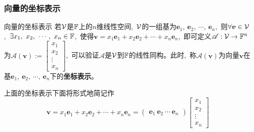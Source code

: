 \documentclass[10pt, a4paper, oneside, fontset=none]{ctexart}
\theoremstyle{plain}
\theoremstyle{definition}
\newcommand{\com}{,\,\,\,\:}
\newcommand{\de}[2][]{\begin{defil}{#1}\kai #2\end{defil}}
\newcommand{\tboba}[1]{\textbf{\kai\color{bali!75!black}#1}}
\begin{document}
\subsubsection{向量的坐标表示}
\de[向量的坐标表示]{
    若$\mathcal{V}$是$\mathbb{F}$上的$n$维线性空间\com $\mathcal{V}$的一组基为$\boldsymbol{e}_1,~\boldsymbol{e}_2,~\cdots,~\boldsymbol{e}_n$\com 则$\forall \boldsymbol{v} \in \mathcal{V}$\com $\exists x_1,~x_2,~\cdots,~x_n \in \mathbb{F}$\com 使得$\boldsymbol{v}=x_1\boldsymbol{e}_1+x_2\boldsymbol{e}_2+\cdots+x_n\boldsymbol{e}_n$\com 即可定义$\mathscr{A}:\mathcal{V} \to \mathbb{F}^n$为$\mathscr{A}(\boldsymbol{v}):=\begin{bmatrix}
        x_1 \\ x_2 \\ \vdots \\ x_n
    \end{bmatrix}$\com 可以验证$\mathscr{A}$是$\mathcal{V}$到$\mathbb{F}$的线性同构。此时\com 称$\mathscr{A}(\boldsymbol{v})$为向量$\boldsymbol{v}$在基$\boldsymbol{e}_1,~\boldsymbol{e}_2,~\cdots,~\boldsymbol{e}_n$下的\tboba{坐标表示}。
}
上面的坐标表示下面将形式地简记作
$$\boldsymbol{v}=x_1\boldsymbol{e}_1+x_2\boldsymbol{e}_2+\cdots+x_n\boldsymbol{e}_n=\begin{pmatrix}
    \boldsymbol{e}_1~\boldsymbol{e}_2~\cdots~\boldsymbol{e}_n
\end{pmatrix}\begin{bmatrix}
    x_1 \\ x_2 \\ \vdots \\ x_n
\end{bmatrix}$$
\end{document}
